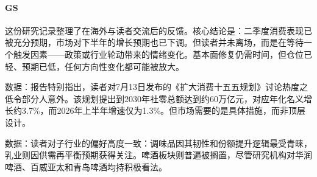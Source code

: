 \documentclass[11pt]{ctexart}
\begin{document}
\paragraph{GS} 这份研究记录整理了在海外与读者交流后的反馈。核心结论是：二季度消费表现已被充分预期，市场对下半年的增长预期也已下调。但读者并未离场，而是在等待一个触发因素——政策或行业轮动带来的情绪变化。基本面修复仍需时间，但仓位已轻、预期已低，任何方向性变化都可能被放大。
{\small\color{refgray}数据：报告特别指出，读者对7月13日发布的《扩大消费十五五规划》讨论热度之低令部分人意外。该规划提出到2030年社零总额达到约60万亿元，对应年化名义增长约3.7\%，而2026年上半年增速仅为1.3\%。但市场需要的是具体措施，而非顶层设计。\par}
{\small\color{refgray}数据：读者对子行业的偏好高度一致：调味品因其韧性和份额提升逻辑最受青睐，乳业则因供需再平衡预期获得关注。啤酒板块则普遍被搁置，尽管研究机构对华润啤酒、百威亚太和青岛啤酒均持积极看法。\par}
\end{document}

